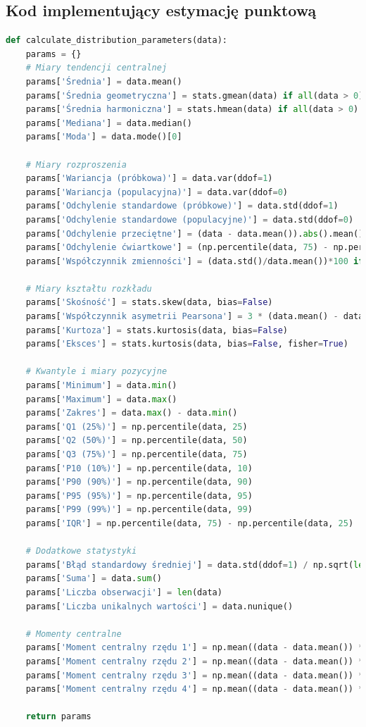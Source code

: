 \documentclass[12pt,a4paper]{article}
\begin{document}
\subsection{Kod implementujący estymację punktową}
\begin{lstlisting}[language=Python, caption=Funkcja do obliczania parametrów rozkładu]
def calculate_distribution_parameters(data):
    params = {}
    # Miary tendencji centralnej
    params['Średnia'] = data.mean()
    params['Średnia geometryczna'] = stats.gmean(data) if all(data > 0) else np.nan
    params['Średnia harmoniczna'] = stats.hmean(data) if all(data > 0) else np.nan
    params['Mediana'] = data.median()
    params['Moda'] = data.mode()[0]

    # Miary rozproszenia
    params['Wariancja (próbkowa)'] = data.var(ddof=1)
    params['Wariancja (populacyjna)'] = data.var(ddof=0)
    params['Odchylenie standardowe (próbkowe)'] = data.std(ddof=1)
    params['Odchylenie standardowe (populacyjne)'] = data.std(ddof=0)
    params['Odchylenie przeciętne'] = (data - data.mean()).abs().mean()
    params['Odchylenie ćwiartkowe'] = (np.percentile(data, 75) - np.percentile(data, 25))/2
    params['Współczynnik zmienności'] = (data.std()/data.mean())*100 if data.mean() != 0 else np.nan

    # Miary kształtu rozkładu
    params['Skośność'] = stats.skew(data, bias=False)
    params['Współczynnik asymetrii Pearsona'] = 3 * (data.mean() - data.median()) / data.std() if data.std() != 0 else np.nan
    params['Kurtoza'] = stats.kurtosis(data, bias=False)
    params['Eksces'] = stats.kurtosis(data, bias=False, fisher=True)  

    # Kwantyle i miary pozycyjne
    params['Minimum'] = data.min()
    params['Maximum'] = data.max()
    params['Zakres'] = data.max() - data.min()
    params['Q1 (25%)'] = np.percentile(data, 25)
    params['Q2 (50%)'] = np.percentile(data, 50)
    params['Q3 (75%)'] = np.percentile(data, 75)
    params['P10 (10%)'] = np.percentile(data, 10)
    params['P90 (90%)'] = np.percentile(data, 90)
    params['P95 (95%)'] = np.percentile(data, 95)
    params['P99 (99%)'] = np.percentile(data, 99)
    params['IQR'] = np.percentile(data, 75) - np.percentile(data, 25)

    # Dodatkowe statystyki
    params['Błąd standardowy średniej'] = data.std(ddof=1) / np.sqrt(len(data))
    params['Suma'] = data.sum()
    params['Liczba obserwacji'] = len(data)
    params['Liczba unikalnych wartości'] = data.nunique()

    # Momenty centralne
    params['Moment centralny rzędu 1'] = np.mean((data - data.mean()) ** 1)
    params['Moment centralny rzędu 2'] = np.mean((data - data.mean()) ** 2)
    params['Moment centralny rzędu 3'] = np.mean((data - data.mean()) ** 3)
    params['Moment centralny rzędu 4'] = np.mean((data - data.mean()) ** 4)

    return params
\end{lstlisting}
\end{document}
